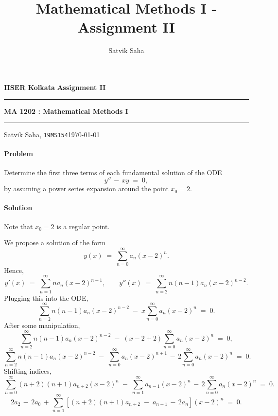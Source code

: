 \documentclass[10pt]{article}
\title{Mathematical Methods I - Assignment II}
\author{Satvik Saha}
\date{}
\newcounter{prob}
\def\problem{\stepcounter{prob}\paragraph{Problem \arabic{prob}}}
\def\solution{\paragraph{Solution}}
\begin{document}
        \par\textbf{IISER Kolkata} \hfill \textbf{Assignment II}
        \vspace{3pt}
        \hrule
        \vspace{3pt}
        \begin{center}
                \LARGE{\textbf{MA 1202 : Mathematical Methods I}}
        \end{center}
        \vspace{3pt}
        \hrule
        \vspace{3pt}
        Satvik Saha, \texttt{19MS154}\hfill\today
        \vspace{20pt}
        
        \problem Determine the first three terms of each fundamental solution of the ODE
        \[
                y'' \,-\, xy \;=\; 0,
        \]
        by assuming a power series expansion around the point $x_0 = 2$.

        \solution
        Note that $x_0 = 2$ is a regular point.

        We propose a solution of the form
        \[
        y(x) \;=\; \sum_{n = 0}^\infty a_n (x - 2)^n.
        \]
        Hence,
        \[
        y'(x) \;=\; \sum_{n = 1}^\infty n a_n (x - 2)^{n - 1}, \quad\quad y''(x) \;=\; \sum_{n = 2}^\infty n(n - 1)a_n (x - 2)^{n - 2}.
        \]
        Plugging this into the ODE,
        \[
        \sum_{n = 2}^\infty n(n - 1)a_n (x - 2)^{n - 2} \;-\; x\sum_{n = 0}^\infty a_n (x-2)^n \;=\; 0.
        \]
        After some manipulation,
        \[
        \sum_{n = 2}^\infty n(n - 1)a_n (x - 2)^{n - 2} \;-\; (x - 2 + 2)\sum_{n = 0}^\infty a_n (x-2)^n \;=\; 0,
        \]
        \[
        \sum_{n = 2}^\infty n(n - 1)a_n (x - 2)^{n - 2} \;-\; \sum_{n = 0}^\infty a_n (x-2)^{n + 1}  \,-\, 2\sum_{n = 0}^\infty a_n(x-2)^n\;=\; 0.
        \]
        Shifting indices,
        \[
        \sum_{n = 0}^\infty (n + 2)(n + 1) a_{n + 2}(x-2)^n \;-\; \sum_{n = 1}^\infty a_{n - 1}(x-2)^n \,-\, 2\sum_{n = 0}^\infty a_n(x-2)^n \;=\; 0.
        \]
        \[
        2a_2 \,-\, 2a_0 \,+\, \sum_{n = 1}^\infty \left[(n + 2)(n + 1) a_{n + 2} \;-\; a_{n - 1} \,-\, 2a_n \right](x-2)^n \;=\; 0.
        \]
\end{document}
